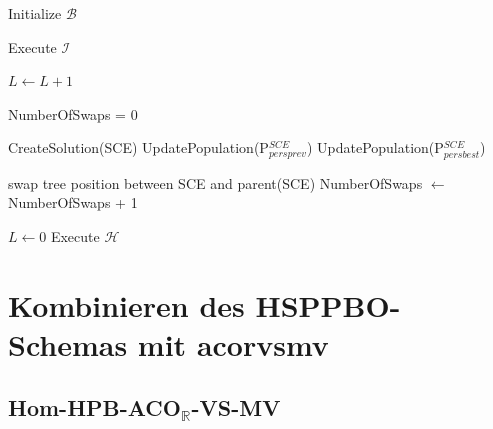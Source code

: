 \documentclass[fontsize=12, a4aper]{scrartcl}
\begin{document}
	\begin{algorithm}[H]
		
		\caption{HSPPBO}\label{sec:HSPPBO_Schema:alg:HSPPBO}
		
		\begin{algorithmic}[1]
			
			\State Initialize \(\mathcal{B}\)
			
			\State Execute \(\mathcal{I}\)
			
			\Repeat
			
				\State \(L \gets L + 1\)
			
				
					\State NumberOfSwaps = 0
				
					\State CreateSolution(SCE)
					\State UpdatePopulation(P\(^{SCE}_{persprev}\))
					\State UpdatePopulation(P\(^{SCE}_{persbest}\))
					
				\EndFor
					
					
						
							\State swap tree position between SCE and parent(SCE)
							\State NumberOfSwaps \(\gets\) NumberOfSwaps + 1

						\EndIf
				
				\EndFor
				
					\State \(L \gets 0\)
					\State Execute \(\mathcal{H}\)
				
				\EndIf
				
			
		\end{algorithmic}
		
	\end{algorithm}
	
	
	\section{Kombinieren des HSPPBO-Schemas mit \acl{acorvsmv}}
	
	\subsection{Hom-HPB-ACO\(_\mathbb{R}\)-VS-MV} \label{subsec:Homogen_HPB_ACO_R_very_simple}
	
\end{document}

